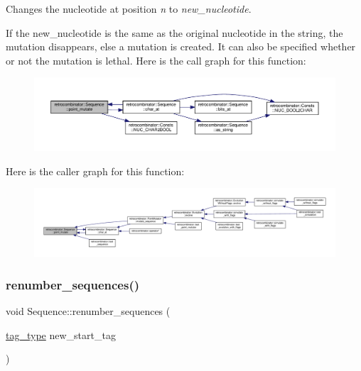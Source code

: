 Changes the nucleotide at position {\itshape n} to {\itshape new\+\_\+nucleotide}. 

If the new\+\_\+nucleotide is the same as the original nucleotide in the string, the mutation disappears, else a mutation is created. It can also be specified whether or not the mutation is lethal. Here is the call graph for this function\+:\nopagebreak
\begin{figure}[H]
\begin{center}
\leavevmode
\includegraphics[width=350pt]{classretrocombinator_1_1Sequence_a85299c3dbf2efb993a43acc2e42fcb00_cgraph}
\end{center}
\end{figure}
Here is the caller graph for this function\+:
\nopagebreak
\begin{figure}[H]
\begin{center}
\leavevmode
\includegraphics[width=350pt]{classretrocombinator_1_1Sequence_a85299c3dbf2efb993a43acc2e42fcb00_icgraph}
\end{center}
\end{figure}
\mbox{\label{classretrocombinator_1_1Sequence_ad4791ec3cefbea417081cd349ac6c23b}} 
\subsubsection{\texorpdfstring{renumber\+\_\+sequences()}{renumber\_sequences()}}
{\footnotesize\ttfamily void Sequence\+::renumber\+\_\+sequences (\begin{DoxyParamCaption}\item[{\hyperlink{namespaceretrocombinator_afd7c6eb4293e8c4d12827609a9a34b9b}{tag\+\_\+type}}]{new\+\_\+start\+\_\+tag }\end{DoxyParamCaption})\hspace{0.3cm}{\ttfamily [static]}}



